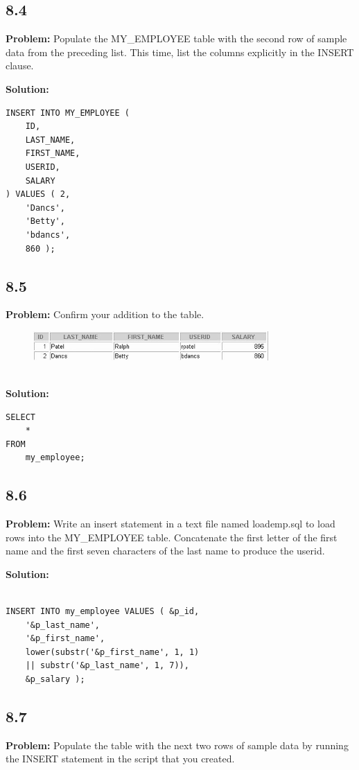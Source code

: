 \documentclass[12pt,a4paper]{article}
\begin{document}
\begin{itemize}
\subsection*{8.4}
\textbf{Problem:} Populate the MY\_EMPLOYEE table with the second row of sample data from the preceding list. This time, list the columns explicitly in the INSERT clause.

\textbf{Solution:}
\begin{lstlisting}
INSERT INTO MY_EMPLOYEE ( 
    ID,
    LAST_NAME,
    FIRST_NAME,
    USERID,
    SALARY
) VALUES ( 2,
    'Dancs',
    'Betty',
    'bdancs',
    860 );
\end{lstlisting}

\subsection*{8.5}
\textbf{Problem:} Confirm your addition to the table.
\\
\begin{figure}[htbp]
  \centering
  \includegraphics[width=0.8\textwidth]{Screenshots/85.png}
\end{figure}\\
\textbf{Solution:}
\begin{lstlisting}
SELECT 
    *
FROM
    my_employee;
\end{lstlisting}
\newpage
\subsection*{8.6}
\textbf{Problem:} Write an insert statement in a text file named loademp.sql to load rows into the MY\_EMPLOYEE table. Concatenate the first letter of the first name and the first seven characters of the last name to produce the userid.

\textbf{Solution:}
\begin{lstlisting}

INSERT INTO my_employee VALUES ( &p_id,
    '&p_last_name',
    '&p_first_name',
    lower(substr('&p_first_name', 1, 1)
    || substr('&p_last_name', 1, 7)),
    &p_salary );

\end{lstlisting}

\subsection*{8.7}
\textbf{Problem:} Populate the table with the next two rows of sample data by running the INSERT statement in the script that you created.


\end{itemize}
\end{document}

